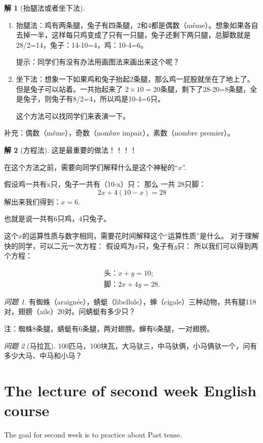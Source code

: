 \documentclass{article}
\theoremstyle{definition}
\newtheorem{jie}{解}
\theoremstyle{remark}
\theoremstyle{theorem}
\newtheorem{ques}{问题}
\begin{document}
\begin{jie}[抬腿法或者坐下法]
\begin{enumerate}
    \item 抬腿法：鸡有两条腿，兔子有四条腿，2和4都是偶数（même）。想象如果各自去掉一半，这样每只鸡变成了只有一只腿，兔子还剩下两只腿，总脚数就是28/2=14，兔子：14-10=4，鸡：10-4=6。
    
    提示：同学们有没有办法用画图法来画出来这个呢？
    \item 坐下法：想象一下如果鸡和兔子抬起2条腿，那么鸡一屁股就坐在了地上了。但是兔子可以站着。一共抬起来了 $2\times10=20$条腿，剩下了28-20=8条腿，全是兔子，则兔子有8/2=4，所以鸡是10-4=6只。
    
    这个方法可以找同学们来表演一下。
\end{enumerate}
补充：偶数（même），奇数（nombre impair），素数（nombre premier）。
\end{jie}
\begin{jie}[方程法]
这是最重要的做法！！！！

在这个方法之前，需要向同学们解释什么是这个神秘的“$x$”.


假设鸡一共有x只，兔子一共有（10-x）只：
那么
一共 28只脚：
$$2x+4(10-x)=28$$
解出来我们得到：$x=6$.

也就是说一共有6只鸡，4只兔子。

这个$x$的运算性质与数字相同，需要花时间解释这个“运算性质”是什么。
对于理解快的同学，可以二元一次方程：
假设鸡为$x$只，兔子有$y$只：
所以我们可以得到两个方程：

\begin{align*}
\text{头：}x+y=10;\\
\text{脚：}2x+4y=28.
\end{align*}

\end{jie}
\begin{ques}
    有蜘蛛（araignée），蜻蜓（libellule），蝉（cigale）三种动物，共有腿118对，翅膀（aile）20对。问蜻蜓有多少只？
    
    注：蜘蛛8条腿，蜻蜓有6条腿，两对翅膀。蝉有6条腿，一对翅膀。
\end{ques}
\begin{ques}[马拉瓦]
    100匹马，100块瓦，大马驮三，中马驮俩，小马俩驮一个，问有多少大马、中马和小马？
\end{ques}
\section{The lecture of second week English course}
The goal for second week is to practice about Past tense. 
\end{document}
